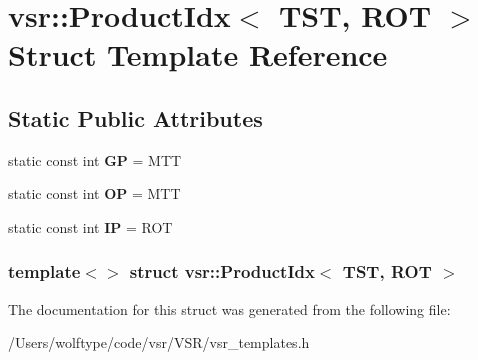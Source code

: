 \hypertarget{structvsr_1_1_product_idx_3_01_t_s_t_00_01_r_o_t_01_4}{\section{vsr\-:\-:Product\-Idx$<$ T\-S\-T, R\-O\-T $>$ Struct Template Reference}
\label{structvsr_1_1_product_idx_3_01_t_s_t_00_01_r_o_t_01_4}
}
\subsection*{Static Public Attributes}
\begin{DoxyCompactItemize}
\item 
\hypertarget{structvsr_1_1_product_idx_3_01_t_s_t_00_01_r_o_t_01_4_a7b7c8cbe0802de32631b3595a146b466}{static const int {\bfseries G\-P} = M\-T\-T}\label{structvsr_1_1_product_idx_3_01_t_s_t_00_01_r_o_t_01_4_a7b7c8cbe0802de32631b3595a146b466}

\item 
\hypertarget{structvsr_1_1_product_idx_3_01_t_s_t_00_01_r_o_t_01_4_ad674576cee0bfaa99ee70d866dbc6dcc}{static const int {\bfseries O\-P} = M\-T\-T}\label{structvsr_1_1_product_idx_3_01_t_s_t_00_01_r_o_t_01_4_ad674576cee0bfaa99ee70d866dbc6dcc}

\item 
\hypertarget{structvsr_1_1_product_idx_3_01_t_s_t_00_01_r_o_t_01_4_a8b0bf70fa40e6a9d416819b303029085}{static const int {\bfseries I\-P} = R\-O\-T}\label{structvsr_1_1_product_idx_3_01_t_s_t_00_01_r_o_t_01_4_a8b0bf70fa40e6a9d416819b303029085}

\end{DoxyCompactItemize}
\subsubsection*{template$<$$>$ struct vsr\-::\-Product\-Idx$<$ T\-S\-T, R\-O\-T $>$}



The documentation for this struct was generated from the following file\-:\begin{DoxyCompactItemize}
\item 
/\-Users/wolftype/code/vsr/\-V\-S\-R/vsr\-\_\-templates.\-h\end{DoxyCompactItemize}
